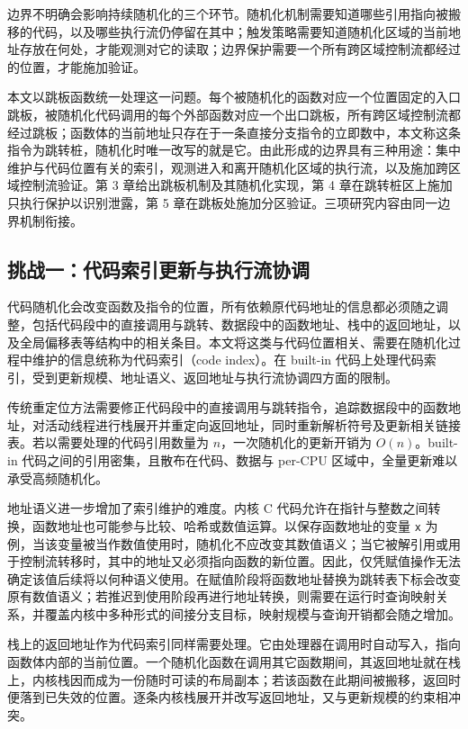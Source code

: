 边界不明确会影响持续随机化的三个环节。随机化机制需要知道哪些引用指向被搬移的代码，以及哪些执行流仍停留在其中；触发策略需要知道随机化区域的当前地址存放在何处，才能观测对它的读取；边界保护需要一个所有跨区域控制流都经过的位置，才能施加验证。

本文以跳板函数统一处理这一问题。每个被随机化的函数对应一个位置固定的入口跳板，被随机化代码调用的每个外部函数对应一个出口跳板，所有跨区域控制流都经过跳板；函数体的当前地址只存在于一条直接分支指令的立即数中，本文称这条指令为跳转桩，随机化时唯一改写的就是它。由此形成的边界具有三种用途：集中维护与代码位置有关的索引，观测进入和离开随机化区域的执行流，以及施加跨区域控制流验证。第 3 章给出跳板机制及其随机化实现，第 4 章在跳转桩区上施加只执行保护以识别泄露，第 5 章在跳板处施加分区验证。三项研究内容由同一边界机制衔接。

\subsection{挑战一：代码索引更新与执行流协调}

代码随机化会改变函数及指令的位置，所有依赖原代码地址的信息都必须随之调整，包括代码段中的直接调用与跳转、数据段中的函数地址、栈中的返回地址，以及全局偏移表等结构中的相关条目。本文将这类与代码位置相关、需要在随机化过程中维护的信息统称为代码索引（code index）。在 built-in 代码上处理代码索引，受到更新规模、地址语义、返回地址与执行流协调四方面的限制。

传统重定位方法需要修正代码段中的直接调用与跳转指令，追踪数据段中的函数地址，对活动线程进行栈展开并重定向返回地址，同时重新解析符号及更新相关链接表。若以需要处理的代码引用数量为 \(n\)，一次随机化的更新开销为 \(O(n)\)。built-in 代码之间的引用密集，且散布在代码、数据与 per-CPU 区域中，全量更新难以承受高频随机化。

地址语义进一步增加了索引维护的难度。内核 C 代码允许在指针与整数之间转换，函数地址也可能参与比较、哈希或数值运算。以保存函数地址的变量 \lstinline[breaklines=false]@x@ 为例，当该变量被当作数值使用时，随机化不应改变其数值语义；当它被解引用或用于控制流转移时，其中的地址又必须指向函数的新位置。因此，仅凭赋值操作无法确定该值后续将以何种语义使用。在赋值阶段将函数地址替换为跳转表下标会改变原有数值语义；若推迟到使用阶段再进行地址转换，则需要在运行时查询映射关系，并覆盖内核中多种形式的间接分支目标，映射规模与查询开销都会随之增加。

栈上的返回地址作为代码索引同样需要处理。它由处理器在调用时自动写入，指向函数体内部的当前位置。一个随机化函数在调用其它函数期间，其返回地址就在栈上，内核栈因而成为一份随时可读的布局副本；若该函数在此期间被搬移，返回时便落到已失效的位置。逐条内核栈展开并改写返回地址，又与更新规模的约束相冲突。

